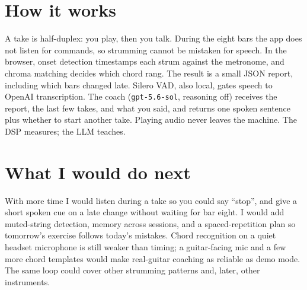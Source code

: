 \documentclass[10pt,a4paper]{article}
\begin{document}
\section{How it works}
A take is half-duplex: you play, then you talk. During the eight bars the app does not listen for commands, so strumming cannot be mistaken for speech. In the browser, onset detection timestamps each strum against the metronome, and chroma matching decides which chord rang. The result is a small JSON report, including which bars changed late. Silero VAD, also local, gates speech to OpenAI transcription. The coach (\texttt{gpt-5.6-sol}, reasoning off) receives the report, the last few takes, and what you said, and returns one spoken sentence plus whether to start another take. Playing audio never leaves the machine. The DSP measures; the LLM teaches.

\section{What I would do next}
With more time I would listen during a take so you could say ``stop'', and give a short spoken cue on a late change without waiting for bar eight. I would add muted-string detection, memory across sessions, and a spaced-repetition plan so tomorrow's exercise follows today's mistakes. Chord recognition on a quiet headset microphone is still weaker than timing; a guitar-facing mic and a few more chord templates would make real-guitar coaching as reliable as demo mode. The same loop could cover other strumming patterns and, later, other instruments.
\end{document}
